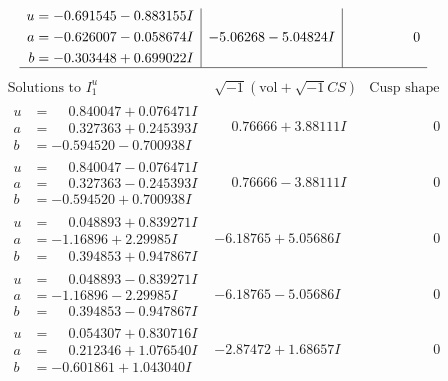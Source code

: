 \documentclass[1p]{elsarticle_modified}
\theoremstyle{definition}
\newcommand{\I}{\sqrt{-1}}
\begin{document}
$$\begin{array}{c|c|c}
\begin{aligned}
u &= -0.691545 - 0.883155 I \\
a &= -0.626007 - 0.058674 I \\
b &= -0.303448 + 0.699022 I\end{aligned}
 & -5.06268 - 5.04824 I & \phantom{-0.000000 } 0\\
 \hline 
 \end{array}$$\newpage$$\begin{array}{c|c|c}  
\text{Solutions to }I^u_{1}& \I (\text{vol} + \sqrt{-1}CS) & \text{Cusp shape}\\
 \hline 
\begin{aligned}
u &= \phantom{-}0.840047 + 0.076471 I \\
a &= \phantom{-}0.327363 + 0.245393 I \\
b &= -0.594520 - 0.700938 I\end{aligned}
 & \phantom{-}0.76666 + 3.88111 I & \phantom{-0.000000 } 0 \\ \hline\begin{aligned}
u &= \phantom{-}0.840047 - 0.076471 I \\
a &= \phantom{-}0.327363 - 0.245393 I \\
b &= -0.594520 + 0.700938 I\end{aligned}
 & \phantom{-}0.76666 - 3.88111 I & \phantom{-0.000000 } 0 \\ \hline\begin{aligned}
u &= \phantom{-}0.048893 + 0.839271 I \\
a &= -1.16896 + 2.29985 I \\
b &= \phantom{-}0.394853 + 0.947867 I\end{aligned}
 & -6.18765 + 5.05686 I & \phantom{-0.000000 } 0 \\ \hline\begin{aligned}
u &= \phantom{-}0.048893 - 0.839271 I \\
a &= -1.16896 - 2.29985 I \\
b &= \phantom{-}0.394853 - 0.947867 I\end{aligned}
 & -6.18765 - 5.05686 I & \phantom{-0.000000 } 0 \\ \hline\begin{aligned}
u &= \phantom{-}0.054307 + 0.830716 I \\
a &= \phantom{-}0.212346 + 1.076540 I \\
b &= -0.601861 + 1.043040 I\end{aligned}
 & -2.87472 + 1.68657 I & \phantom{-0.000000 } 0 \\ \hline\begin{aligned}

\end{aligned}
\end{array}$$
\end{document}
